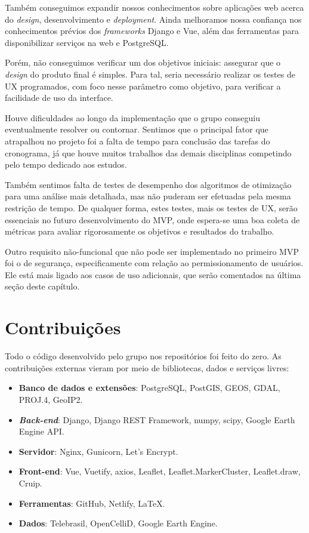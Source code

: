 \documentclass[]{politex}
\begin{document}
Também conseguimos expandir nossos conhecimentos sobre aplicações web acerca do
\textit{design}, desenvolvimento e \textit{deployment}. Ainda melhoramos nossa
confiança nos conhecimentos prévios dos \textit{frameworks} Django e Vue, além
das ferramentas para disponibilizar serviços na web e PostgreSQL.

Porém, não conseguimos verificar um dos objetivos iniciais: assegurar que
o \textit{design} do produto final é simples. Para tal, seria necessário
realizar os testes de UX programados, com foco nesse parâmetro como objetivo,
para verificar a facilidade de uso da interface.

Houve dificuldades ao longo da implementação que o grupo conseguiu eventualmente
resolver ou contornar. Sentimos que o principal fator que atrapalhou no projeto
foi a falta de tempo para conclusão das tarefas do cronograma, já que houve
muitos trabalhos das demais disciplinas competindo pelo tempo dedicado aos
estudos.

Também sentimos falta de testes de desempenho dos algoritmos de otimização para
uma análise mais detalhada, mas não puderam ser efetuadas pela mesma restrição
de tempo. De qualquer forma, estes testes, mais os testes de UX, serão
essenciais no futuro desenvolvimento do MVP, onde espera-se uma boa coleta de
métricas para avaliar rigorosamente os objetivos e resultados do trabalho.

Outro requisito não-funcional que não pode ser implementado no primeiro MVP foi
o de segurança, especificamente com relação ao permissionamento de usuários.
Ele está mais ligado aos casos de uso adicionais, que serão comentados na última
seção deste capítulo.

\section{Contribuições}

Todo o código desenvolvido pelo grupo nos repositórios foi feito do zero. As
contribuições externas vieram por meio de bibliotecas, dados e serviços livres:

\begin{itemize}
\item \textbf{Banco de dados e extensões}: PostgreSQL, PostGIS, GEOS, GDAL,
PROJ.4, GeoIP2.
\item \textbf{\textit{Back-end}}: Django, Django REST Framework, numpy, scipy,
Google Earth Engine API.
\item \textbf{Servidor}: Nginx, Gunicorn, Let's Encrypt.
\item \textbf{Front-end}: Vue, Vuetify, axios, Leaflet, Leaflet.MarkerCluster,
Leaflet.draw, Cruip.
\item \textbf{Ferramentas}: GitHub, Netlify, LaTeX.
\item \textbf{Dados}: Telebrasil, OpenCelliD, Google Earth Engine.
\end{itemize}
\end{document}
